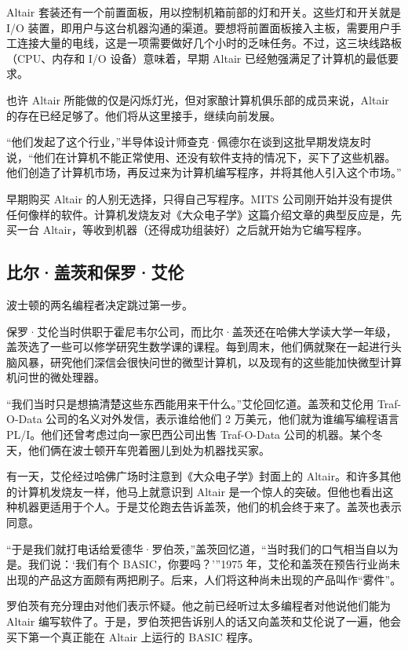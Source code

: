 \documentclass[12pt,UTF8]{ctexbook}
\begin{document}
Altair 套装还有一个前置面板，用以控制机箱前部的灯和开关。这些灯和开关就是 I/O 装置，即用户与这台机器沟通的渠道。要想将前置面板接入主板，需要用户手工连接大量的电线，这是一项需要做好几个小时的乏味任务。不过，这三块线路板（CPU、内存和 I/O 设备）意味着，早期 Altair 已经勉强满足了计算机的最低要求。

也许 Altair 所能做的仅是闪烁灯光，但对家酿计算机俱乐部的成员来说，Altair 的存在已经足够了。他们将从这里接手，继续向前发展。

“他们发起了这个行业，”半导体设计师查克·佩德尔在谈到这批早期发烧友时说，“他们在计算机不能正常使用、还没有软件支持的情况下，买下了这些机器。他们创造了计算机市场，再反过来为计算机编写程序，并将其他人引入这个市场。”

早期购买 Altair 的人别无选择，只得自己写程序。MITS 公司刚开始并没有提供任何像样的软件。计算机发烧友对《大众电子学》这篇介绍文章的典型反应是，先买一台 Altair，等收到机器（还得成功组装好）之后就开始为它编写程序。





\subsection{比尔·盖茨和保罗·艾伦}


波士顿的两名编程者决定跳过第一步。

保罗·艾伦当时供职于霍尼韦尔公司，而比尔·盖茨还在哈佛大学读大学一年级，盖茨选了一些可以修学研究生数学课的课程。每到周末，他们俩就聚在一起进行头脑风暴，研究他们深信会很快问世的微型计算机，以及现有的这些能加快微型计算机问世的微处理器。

“我们当时只是想搞清楚这些东西能用来干什么。”艾伦回忆道。盖茨和艾伦用 Traf-O-Data 公司的名义对外发信，表示谁给他们 2 万美元，他们就为谁编写编程语言 PL/I。他们还曾考虑过向一家巴西公司出售 Traf-O-Data 公司的机器。某个冬天，他们俩在波士顿开车兜着圈儿到处为机器找买家。

有一天，艾伦经过哈佛广场时注意到《大众电子学》封面上的 Altair。和许多其他的计算机发烧友一样，他马上就意识到 Altair 是一个惊人的突破。但他也看出这种机器更适用于个人。于是艾伦跑去告诉盖茨，他们的机会终于来了。盖茨也表示同意。

“于是我们就打电话给爱德华·罗伯茨，”盖茨回忆道，“当时我们的口气相当自以为是。我们说：‘我们有个 BASIC，你要吗？’”1975 年，艾伦和盖茨在预告行业尚未出现的产品这方面颇有两把刷子。后来，人们将这种尚未出现的产品叫作“雾件”。

罗伯茨有充分理由对他们表示怀疑。他之前已经听过太多编程者对他说他们能为 Altair 编写软件了。于是，罗伯茨把告诉别人的话又向盖茨和艾伦说了一遍，他会买下第一个真正能在 Altair 上运行的 BASIC 程序。
\end{document}
